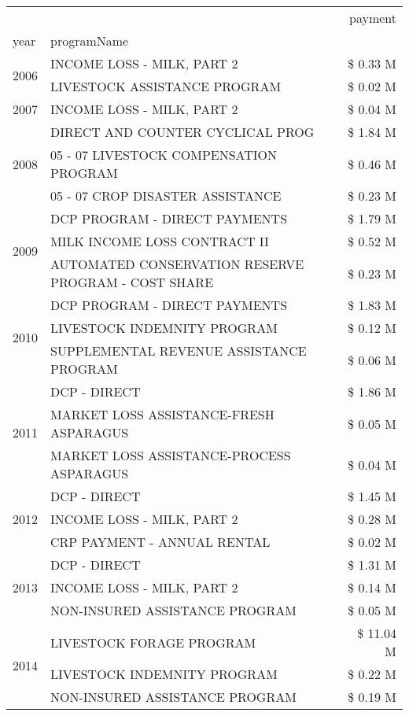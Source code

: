 \begin{tabular}{llr}
\toprule
 &  & payment \\
year & programName &  \\
\midrule
\multirow[t]{2}{*}{2006} & INCOME LOSS - MILK, PART 2 & \$ 0.33 M \\
 & LIVESTOCK ASSISTANCE PROGRAM & \$ 0.02 M \\
\cline{1-3}
2007 & INCOME LOSS - MILK, PART 2 & \$ 0.04 M \\
\cline{1-3}
\multirow[t]{3}{*}{2008} & DIRECT AND COUNTER CYCLICAL PROG & \$ 1.84 M \\
 & 05 - 07 LIVESTOCK COMPENSATION PROGRAM & \$ 0.46 M \\
 & 05 - 07 CROP DISASTER ASSISTANCE & \$ 0.23 M \\
\cline{1-3}
\multirow[t]{3}{*}{2009} & DCP PROGRAM - DIRECT PAYMENTS & \$ 1.79 M \\
 & MILK INCOME LOSS CONTRACT II & \$ 0.52 M \\
 & AUTOMATED CONSERVATION RESERVE PROGRAM - COST SHARE & \$ 0.23 M \\
\cline{1-3}
\multirow[t]{3}{*}{2010} & DCP PROGRAM - DIRECT PAYMENTS & \$ 1.83 M \\
 & LIVESTOCK INDEMNITY PROGRAM & \$ 0.12 M \\
 & SUPPLEMENTAL REVENUE ASSISTANCE PROGRAM & \$ 0.06 M \\
\cline{1-3}
\multirow[t]{3}{*}{2011} & DCP - DIRECT & \$ 1.86 M \\
 & MARKET LOSS ASSISTANCE-FRESH ASPARAGUS & \$ 0.05 M \\
 & MARKET LOSS ASSISTANCE-PROCESS ASPARAGUS & \$ 0.04 M \\
\cline{1-3}
\multirow[t]{3}{*}{2012} & DCP - DIRECT & \$ 1.45 M \\
 & INCOME LOSS - MILK, PART 2 & \$ 0.28 M \\
 & CRP PAYMENT - ANNUAL RENTAL & \$ 0.02 M \\
\cline{1-3}
\multirow[t]{3}{*}{2013} & DCP - DIRECT & \$ 1.31 M \\
 & INCOME LOSS - MILK, PART 2 & \$ 0.14 M \\
 & NON-INSURED ASSISTANCE PROGRAM & \$ 0.05 M \\
\cline{1-3}
\multirow[t]{3}{*}{2014} & LIVESTOCK FORAGE PROGRAM & \$ 11.04 M \\
 & LIVESTOCK INDEMNITY PROGRAM & \$ 0.22 M \\
 & NON-INSURED ASSISTANCE PROGRAM & \$ 0.19 M \\
\cline{1-3}

\end{tabular}
